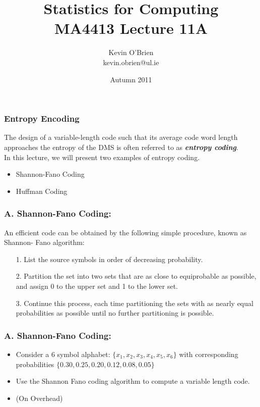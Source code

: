 ﻿\documentclass[a4]{beamer}
\title[MA4413]{Statistics for Computing \\ {\normalsize MA4413 Lecture 11A}}
\author[Kevin O'Brien]{Kevin O'Brien \\ {\scriptsize kevin.obrien@ul.ie}}
\date{Autumn 2011}
\institute[Maths \& Stats]{Dept. of Mathematics \& Statistics, \\ University \textit{of} Limerick}
\begin{document}

\begin{frame}
\frametitle{Entropy Encoding}
The design of a variable-length code such that its average code word length approaches the
entropy of the DMS is often referred to as \textbf{\emph{entropy coding}}.\\ \bigskip In this lecture, we will present two examples of
entropy coding.
\begin{itemize}
\item Shannon-Fano Coding
\item Huffman Coding
\end{itemize}
\end{frame}
\begin{frame}
\frametitle{A. Shannon-Fano Coding:}
An efficient code can be obtained by the following simple procedure, known as
Shannon- Fano algorithm:
\begin{itemize}
\item[1.] List the source symbols in order of decreasing probability.
\item[2.] Partition the set into two sets that are as close to equiprobable as possible, and assign 0 to the
upper set and 1 to the lower set.
\item[3.] Continue this process, each time partitioning the sets with as nearly equal probabilities as possible until no further partitioning is possible.
\end{itemize}
\end{frame}
\begin{frame}
\frametitle{A. Shannon-Fano Coding:}
\begin{itemize}
\item Consider a 6 symbol alphabet: $\{x_1, x_2, x_3, x_4, x_5,x_6\}$ with corresponding probabilities $\{0.30, 0.25, 0.20, 0.12, 0.08,0.05\}$
\item Use the Shannon Fano coding algorithm to compute a variable length code.
\item (On Overhead)
\end{itemize}
\end{frame}
\end{document}
